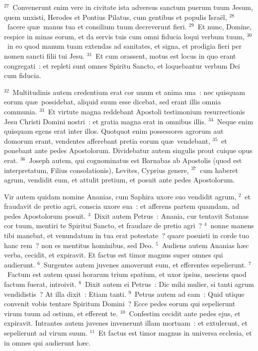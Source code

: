 ${}^{27}$~Convenerunt enim vere in civitate ista adversus sanctum puerum tuum Jesum, quem unxisti, Herodes et Pontius Pilatus, cum gentibus et populis Isra\"el,
${}^{28}$~facere qu\ae\ manus tua et consilium tuum decreverunt fieri.
${}^{29}$~Et nunc, Domine, respice in minas eorum, et da servis tuis cum omni fiducia loqui verbum tuum,
${}^{30}$~in eo quod manum tuam extendas ad sanitates, et signa, et prodigia fieri per nomen sancti filii tui Jesu.
${}^{31}$~Et cum orassent, motus est locus in quo erant congregati~: et repleti sunt omnes Spiritu Sancto, et loquebantur verbum Dei cum fiducia.


${}^{32}$~Multitudinis autem credentium erat cor unum et anima una~: nec quisquam eorum qu\ae\ possidebat, aliquid suum esse dicebat, sed erant illis omnia communia.
${}^{33}$~Et virtute magna reddebant Apostoli testimonium resurrectionis Jesu Christi Domini nostri~: et gratia magna erat in omnibus illis.
${}^{34}$~Neque enim quisquam egens erat inter illos. Quotquot enim possessores agrorum aut domorum erant, vendentes afferebant pretia eorum qu\ae\ vendebant,
${}^{35}$~et ponebant ante pedes Apostolorum. Dividebatur autem singulis prout cuique opus erat.
${}^{36}$~Joseph autem, qui cognominatus est Barnabas ab Apostolis (quod est interpretatum, Filius consolationis), Levites, Cyprius genere,
${}^{37}$~cum haberet agrum, vendidit eum, et attulit pretium, et posuit ante pedes Apostolorum.

\lettrine[lines=3,image=true,loversize=0.05,lraise=-0.03]{V}{}ir autem quidam nomine Ananias, cum Saphira uxore suo vendidit agrum,
${}^{2}$~et fraudavit de pretio agri, conscia uxore sua~: et afferens partem quamdam, ad pedes Apostolorum posuit.
${}^{3}$~Dixit autem Petrus~: Anania, cur tentavit Satanas cor tuum, mentiri te Spiritui Sancto, et fraudare de pretio agri~?
${}^{4}$~nonne manens tibi manebat, et venundatum in tua erat potestate~? quare posuisti in corde tuo hanc rem~? non es mentitus hominibus, sed Deo.
${}^{5}$~Audiens autem Ananias h\ae c verba, cecidit, et expiravit. Et factus est timor magnus super omnes qui audierunt.
${}^{6}$~Surgentes autem juvenes amoverunt eum, et efferentes sepelierunt.
${}^{7}$~Factum est autem quasi horarum trium spatium, et uxor ipsius, nesciens quod factum fuerat, introivit.
${}^{8}$~Dixit autem ei Petrus~: Dic mihi mulier, si tanti agrum vendidistis~? At illa dixit~: Etiam tanti.
${}^{9}$~Petrus autem ad eam~: Quid utique convenit vobis tentare Spiritum Domini~? Ecce pedes eorum qui sepelierunt virum tuum ad ostium, et efferent te.
${}^{10}$~Confestim cecidit ante pedes ejus, et expiravit. Intrantes autem juvenes invenerunt illam mortuam~: et extulerunt, et sepelierunt ad virum suum.
${}^{11}$~Et factus est timor magnus in universa ecclesia, et in omnes qui audierunt h\ae c.


